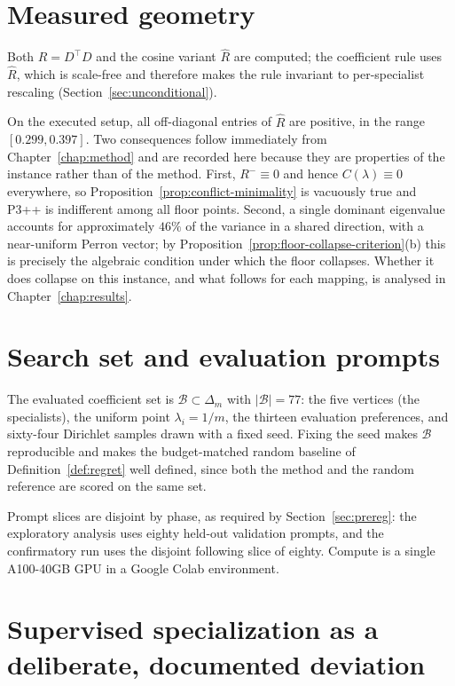 \documentclass[12pt,a4paper]{report}
\newcommand{\1}{\mathbf{1}}
\newcommand{\Bset}{\mathcal{B}}
\theoremstyle{definition}
\begin{document}
\section{Measured geometry}
\label{sec:geometry}

Both \(R=D^\top D\) and the cosine variant \(\hat R\) are computed; the coefficient rule uses \(\hat R\), which is scale-free and therefore makes the rule invariant to per-specialist rescaling (Section~\ref{sec:unconditional}).

On the executed setup, all off-diagonal entries of \(\hat R\) are positive, in the range \([0.299,0.397]\). Two consequences follow immediately from Chapter~\ref{chap:method} and are recorded here because they are properties of the instance rather than of the method. First, \(R^-\equiv0\) and hence \(C(\lambda)\equiv0\) everywhere, so Proposition~\ref{prop:conflict-minimality} is vacuously true and P3++ is indifferent among all floor points. Second, a single dominant eigenvalue accounts for approximately \(46\%\) of the variance in a shared direction, with a near-uniform Perron vector; by Proposition~\ref{prop:floor-collapse-criterion}(b) this is precisely the algebraic condition under which the floor collapses. Whether it does collapse on this instance, and what follows for each mapping, is analysed in Chapter~\ref{chap:results}.

\section{Search set and evaluation prompts}
\label{sec:search-set}

The evaluated coefficient set is \(\Bset\subset\Delta_m\) with \(\lvert\Bset\rvert=77\): the five vertices (the specialists), the uniform point \(\lambda_i=1/m\), the thirteen evaluation preferences, and sixty-four Dirichlet samples drawn with a fixed seed. Fixing the seed makes \(\Bset\) reproducible and makes the budget-matched random baseline of Definition~\ref{def:regret} well defined, since both the method and the random reference are scored on the same set.

Prompt slices are disjoint by phase, as required by Section~\ref{sec:prereg}: the exploratory analysis uses eighty held-out validation prompts, and the confirmatory run uses the disjoint following slice of eighty. Compute is a single A100-40GB GPU in a Google Colab environment.

\section{Supervised specialization as a deliberate, documented deviation}
\label{sec:sft-deviation}
\end{document}
